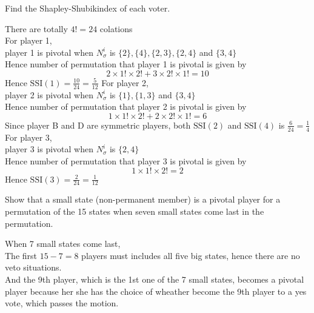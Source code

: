\documentclass[12pt]{article}
\newenvironment{question}[2][Q]{\begin{trivlist}
    \item[\hskip \labelsep {\bfseries #1}\hskip \labelsep {\bfseries #2.}]}{\end{trivlist}}
\newenvironment{answer}[2][A]{\begin{trivlist}
    \item[\hskip \labelsep {\bfseries #1}\hskip \labelsep {\bfseries #2.}]}{\end{trivlist}}
\begin{document}
\begin{question}{1d}
	Find the Shapley-Shubikindex of each voter.
\end{question}
\begin{answer}{1d}

\end{answer}
There are totally $4!=24$ colations \\
For player 1, \\
player 1 is pivotal when $N^i_\sigma$ is $\{2\},\{4\},\{2,3\},\{2,4\}$ and $\{3,4\}$ \\
Hence number of permutation that player 1 is pivotal is given by
\begin{equation}
	2 \times 1! \times 2!+3 \times 2! \times 1!=10
\end{equation}
Hence $\textrm{SSI}(1)=\frac{10}{24}=\frac 5 {12}$
For player 2, \\
player 2 is pivotal when $N^i_\sigma$ is $\{1\},\{1,3\}$ and $\{3,4\}$ \\
Hence number of permutation that player 2 is pivotal is given by
\begin{equation}
	1 \times 1! \times 2! + 2 \times 2! \times 1! = 6
\end{equation}
Since player B and D are symmetric players, both $\textrm{SSI}(2)$ and $\textrm{SSI}(4)$ is $\frac 6 {24} = \frac 1 4$ \\
For player 3, \\
player 3 is pivotal when $N^i_\sigma$ is $\{2,4\}$\\
Hence number of permutation that player 3 is pivotal is given by
\begin{equation}
	1 \times 1! \times 2! = 2
\end{equation}
Hence $\textrm{SSI}(3)=\frac{2}{24}=\frac 1 {12}$

\begin{question}{2a}
	Show that a small state (non-permanent member) is a pivotal player for a permutation of the 15 states when seven small states come last in the permutation.
\end{question}
\begin{answer}{2a}
\end{answer}
When 7 small states come last, \\
The first $15-7=8$ players must includes all five big states, hence there are no veto situations. \\
And the 9th player, which is the 1st one of the 7 small states, becomes a pivotal player because her she has the choice of wheather become the 9th player to a yes vote, which passes the motion.
\end{document}
